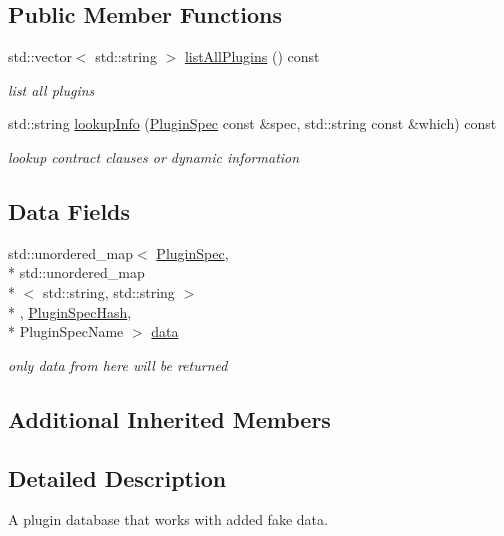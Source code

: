 \subsection*{Public Member Functions}
\begin{DoxyCompactItemize}
\item 
std\+::vector$<$ std\+::string $>$ \hyperlink{classkdb_1_1tools_1_1MockPluginDatabase_afb3aef79c6e8447f2555dae303ce1893}{list\+All\+Plugins} () const 
\begin{DoxyCompactList}\small\item\em list all plugins \end{DoxyCompactList}\item 
std\+::string \hyperlink{classkdb_1_1tools_1_1MockPluginDatabase_af1e8fa2f1ff8a1c5ac7005dd65101e93}{lookup\+Info} (\hyperlink{classkdb_1_1tools_1_1PluginSpec}{Plugin\+Spec} const \&spec, std\+::string const \&which) const 
\begin{DoxyCompactList}\small\item\em lookup contract clauses or dynamic information \end{DoxyCompactList}\end{DoxyCompactItemize}
\subsection*{Data Fields}
\begin{DoxyCompactItemize}
\item 
std\+::unordered\+\_\+map$<$ \hyperlink{classkdb_1_1tools_1_1PluginSpec}{Plugin\+Spec}, \\*
std\+::unordered\+\_\+map\\*
$<$ std\+::string, std\+::string $>$\\*
, \hyperlink{structkdb_1_1tools_1_1PluginSpecHash}{Plugin\+Spec\+Hash}, \\*
Plugin\+Spec\+Name $>$ \hyperlink{classkdb_1_1tools_1_1MockPluginDatabase_a5de7756d9e7fb78d53903c92208d7fbe}{data}
\begin{DoxyCompactList}\small\item\em only data from here will be returned \end{DoxyCompactList}\end{DoxyCompactItemize}
\subsection*{Additional Inherited Members}


\subsection{Detailed Description}
A plugin database that works with added fake data. 

